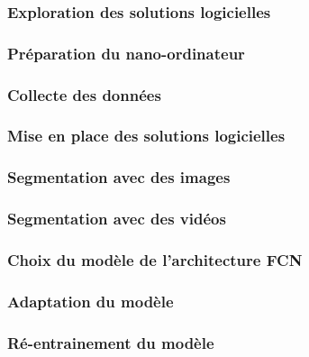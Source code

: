 \subsubsection{Exploration des solutions logicielles}

\subsubsection{Préparation du nano-ordinateur}

\subsubsection{Collecte des données}

\subsubsection{Mise en place des solutions logicielles}

\subsubsection{Segmentation avec des images}

\subsubsection{Segmentation avec des vidéos}


\subsubsection{Choix du modèle de l'architecture FCN}

\subsubsection{Adaptation du modèle}

\subsubsection{Ré-entrainement du modèle}


